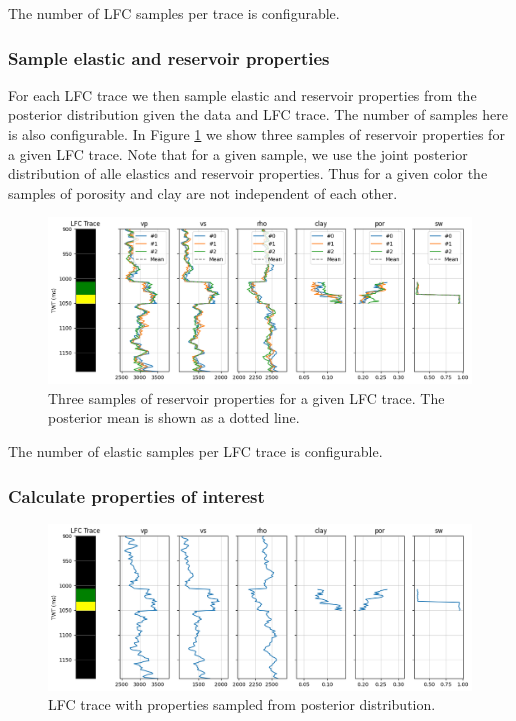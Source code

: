 \documentclass[note,screen,english,12pt,utf8]{nrdoc}
\begin{document}
The number of LFC samples per trace is configurable.

\subsubsection{Sample elastic and reservoir properties}
For each LFC trace we then sample elastic and reservoir properties
from the posterior distribution given the data and LFC trace.
The number of samples here is also configurable. In Figure \ref{fig:sampled_properties}
we show three samples of reservoir properties for a given LFC trace. Note that
for a given sample, we use the joint posterior distribution of alle elastics
and reservoir properties. Thus for a given color the samples of porosity
and clay are not independent of each other.
\begin{figure}[h]
    \centering
    \includegraphics[width=\textwidth]{figures/sampled_properties_with_mean_il57_xl62.png}
    \caption{Three samples of reservoir properties for a given LFC trace. The posterior mean is shown as a dotted line.}
    \label{fig:sampled_properties}
\end{figure}

The number of elastic samples per LFC trace is configurable.

\subsubsection{Calculate properties of interest}

\begin{figure}[h]
    \centering
    \includegraphics[width=\textwidth]{figures/sampled_properties_il57_xl62.png}
    \caption{LFC trace with properties sampled from posterior distribution.}
    \label{fig:lfc_trace_and_properties}
\end{figure}
\end{document}
